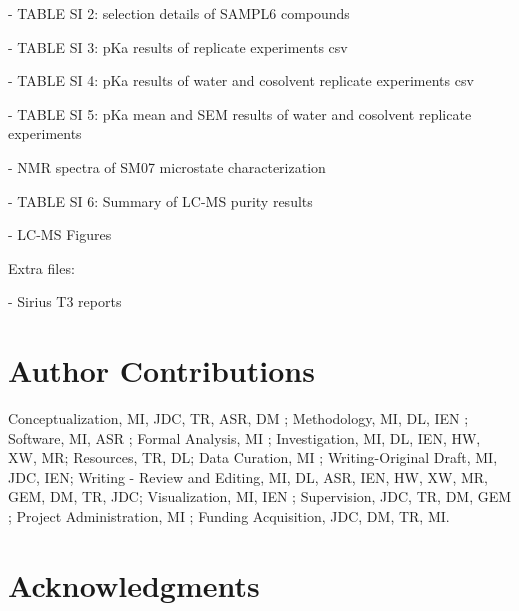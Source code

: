 \documentclass[9pt,lineno]{elife}
\begin{document}
- TABLE SI 2: selection details of SAMPL6 compounds  

- TABLE SI 3: pKa results of replicate experiments csv

- TABLE SI 4: pKa results of water and cosolvent replicate experiments csv

- TABLE SI 5: pKa mean and SEM results of water and cosolvent replicate experiments

- NMR spectra of SM07 microstate characterization  

- TABLE SI 6: Summary of LC-MS purity results


- LC-MS Figures  


Extra files:  

- Sirius T3 reports  



\section{Author Contributions}

Conceptualization, MI, JDC, TR, ASR, DM  ; Methodology, MI, DL, IEN ; Software, MI, ASR ; Formal Analysis, MI ; Investigation, MI, DL, IEN, HW, XW, MR; Resources, TR, DL;  Data Curation, MI ; Writing-Original Draft, MI, JDC, IEN; Writing - Review and Editing, MI, DL, ASR, IEN, HW, XW, MR, GEM, DM, TR, JDC; Visualization, MI, IEN ; Supervision, JDC, TR, DM, GEM ; Project Administration, MI ; Funding Acquisition, JDC, DM, TR, MI. 


\section{Acknowledgments}
\end{document}
